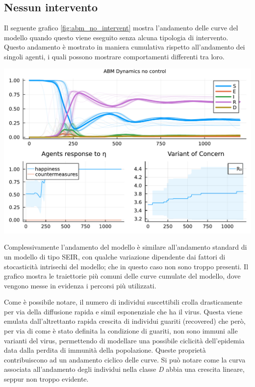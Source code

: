 \subsection{Nessun intervento}
Il seguente grafico \ref{fig:abm_no_intervent} mostra l'andamento delle curve del modello
quando questo viene eseguito senza alcuna tipologia di intervento. Questo andamento è mostrato 
in maniera cumulativa rispetto all'andamento dei singoli agenti, i quali possono mostrare comportamenti 
differenti tra loro.

\begin{minipage}{\linewidth}
	\centering
	\includegraphics[width=\textwidth]{img/SocialNetworkABM_NO_CONTROL.pdf}
	\label{fig:abm_no_intervent}
\end{minipage}

Complessivamente l'andamento del modello è similare all'andamento standard di un modello di tipo  
SEIR, con qualche variazione dipendente dai fattori di stocasticità intrisechi del modello; che in questo
caso non sono troppo presenti. Il grafico mostra le traiettorie più comuni delle curve cumulate del modello, 
dove vengono messe in evidenza i percorsi più utilizzati. 

Come è possibile notare, il numero di individui suscettibili crolla drasticamente
per via della diffusione rapida e simil esponenziale che ha il virus. Questa viene emulata
dall'altrettanto rapida crescita di individui guariti (recovered) che però, per via
di come è stato definita la condizione di guariti, non sono immuni alle varianti del virus, permettendo 
di modellare una possibile ciclicità dell'epidemia data dalla perdita di immunità della popolazione. 
Queste proprietà contribuiscono ad un andamento ciclico delle curve. Si può notare come 
la curva associata all'andamento degli individui nella classe \emph{D} abbia una crescita lineare, 
seppur non troppo evidente.

